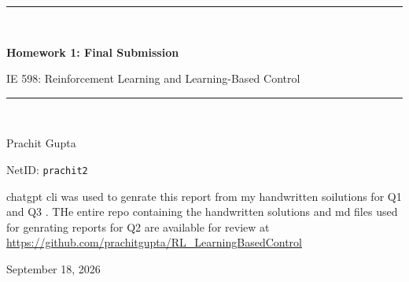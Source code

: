 \documentclass[11pt]{article}
\begin{document}
\begin{titlepage}
  \centering
  \vspace*{1.35in}
  {\color{navy}\rule{\textwidth}{1.4pt}}\\[0.34in]
  {\Huge\bfseries Homework 1: Final Submission\par}
  \vspace{0.22in}
  {\Large IE 598: Reinforcement Learning and Learning-Based Control\par}
  \vspace{0.34in}
  {\color{navy}\rule{\textwidth}{1.4pt}}\\[0.65in]
  {\Large Prachit Gupta\par}
  \vspace{0.10in}
  {\large NetID: \texttt{prachit2}\par}
  \vfill
  \begin{minipage}{0.84\textwidth}
    \small
    chatgpt cli was used to genrate this report from my handwritten soilutions for
    Q1 and Q3 . THe entire repo containing the handwritten solutions and md files
    used for genrating reports for Q2 are available for review at
    \url{https://github.com/prachitgupta/RL_LearningBasedControl}
  \end{minipage}
  \par
  \vspace{0.35in}
  {\large September 18, 2026\par}
\end{titlepage}

\tableofcontents
\clearpage
{}


\clearpage

\clearpage

\end{document}
